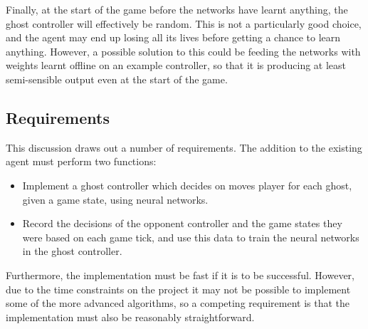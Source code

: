 Finally, at the start of the game before the networks have learnt anything, the ghost controller will effectively be random.  This is not a particularly good choice, and the agent may end up losing all its lives before getting a chance to learn anything.  However, a possible solution to this could be feeding the networks with weights learnt offline on an example controller, so that it is producing at least semi-sensible output even at the start of the game.

\subsection{Requirements}

This discussion draws out a number of requirements.  The addition to the existing agent must perform two functions:

\begin{itemize}
\item Implement a ghost controller which decides on moves player for each ghost, given a game state, using neural networks.
\item Record the decisions of the opponent controller and the game states they were based on each game tick, and use this data to train the neural networks in the ghost controller.
\end{itemize}

Furthermore, the implementation must be fast if it is to be successful.  However, due to the time constraints on the project it may not be possible to implement some of the more advanced algorithms, so a competing requirement is that the implementation must also be reasonably straightforward.

